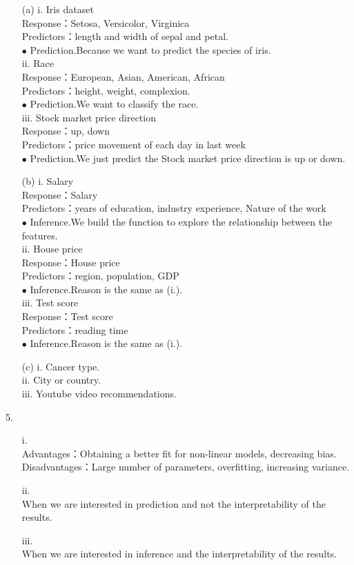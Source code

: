 \documentclass[12pt]{article}
\begin{document}
\begin{itemize}
\item[(a)]
i. Iris dataset\\
Response：Setosa, Versicolor, Virginica\\
Predictors：length and width of sepal and petal.\\
$\bullet$ Prediction.Because we want to predict the species of iris.\\[2ex]
ii. Race\\
Response：European, Asian, American, African\\
Predictors：height, weight, complexion.\\
$\bullet$ Prediction.We want to classify the race.\\[2ex]
iii. Stock market price direction\\
Response：up, down\\
Predictors：price movement of each day in last week\\
$\bullet$ Prediction.We just predict the Stock market price direction is up or down.
\item[(b)]
i. Salary\\
Response：Salary\\
Predictors：years of education, industry experience, Nature of the work\\
$\bullet$ Inference.We build the function to explore the relationship between the features. \\[2ex]
ii. House price\\
Response：House price\\
Predictors：region, population, GDP\\
$\bullet$ Inference.Reason is the same as (i.).\\[2ex]
iii. Test score\\
Response：Test score\\
Predictors：reading time\\
$\bullet$ Inference.Reason is the same as (i.).
\item[(c)]
i. Cancer type.\\
ii. City or country.\\
iii. Youtube video recommendations.
\end{itemize}
\newpage
\Large{5.}
\normalsize
\begin{itemize}
\item[i.]
\ \\
Advantages：Obtaining a better fit for non-linear models, decreasing bias.\\[3ex]
Disadvantages：Large number of parameters, overfitting, increasing variance.
\item[ii.]
\ \\
When we are interested in prediction and not the interpretability of the results.
\item[iii.]
\ \\
When we are interested in inference and the interpretability of the results.
\end{itemize}
\end{document}
